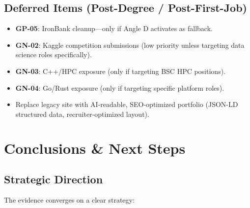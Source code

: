 \documentclass[a4paper,11pt,openany]{report}
\begin{document}
\section{Deferred Items (Post-Degree / Post-First-Job)}

\begin{itemize}
  \item \textbf{GP-05}: IronBank cleanup---only if Angle D activates as
    fallback.
  \item \textbf{GN-02}: Kaggle competition submissions (low priority unless
    targeting data science roles specifically).
  \item \textbf{GN-03}: C++/HPC exposure (only if targeting BSC HPC
    positions).
  \item \textbf{GN-04}: Go/Rust exposure (only if targeting specific platform
    roles).
  \item Replace legacy site with AI-readable, SEO-optimized portfolio
    (JSON-LD structured data, recruiter-optimized layout).
\end{itemize}



\chapter{Conclusions \& Next Steps}
\label{ch:conclusions}


\section{Strategic Direction}

The evidence converges on a clear strategy:
\end{document}
